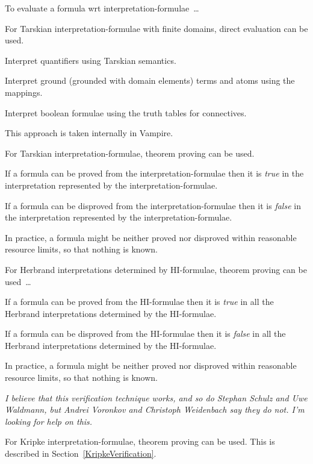 \documentclass{easychair}
\newenvironment{packed_itemize}{
\vspace*{-0.3em}
\begin{itemize}
\setlength{\partopsep}{0pt}
\setlength{\itemsep}{1pt}
\setlength{\parskip}{0pt}
\setlength{\parsep}{0pt}
}{\end{itemize}}
\begin{document}
To evaluate a formula wrt interpretation-formulae~\ldots
\begin{packed_itemize}
\item For Tarskian interpretation-formulae with finite domains, direct evaluation can be used.
      \begin{packed_itemize}
      \item Interpret quantifiers using Tarskian semantics.
      \item Interpret ground (grounded with domain elements) terms and atoms using the mappings.
      \item Interpret boolean formulae using the truth tables for connectives.
      \end{packed_itemize}
      This approach is taken internally in Vampire.
\item For Tarskian interpretation-formulae, theorem proving can be used.
      \begin{packed_itemize}
      \item If a formula can be proved from the interpretation-formulae then it is \textit{true} 
            in the interpretation represented by the interpretation-formulae.
      \item If a formula can be disproved from the interpretation-formulae then it is 
            \textit{false} in the interpretation represented by the interpretation-formulae.
      \item In practice, a formula might be neither proved nor disproved within reasonable 
            resource limits, so that nothing is known.
      \end{packed_itemize}
\item For Herbrand interpretations determined by HI-formulae, theorem proving can be used~\ldots
      \begin{packed_itemize}
      \item If a formula can be proved from the HI-formulae then it is \textit{true} in all 
            the Herbrand interpretations determined by the HI-formulae.
      \item If a formula can be disproved from the HI-formulae then it is \textit{false} in 
            all the Herbrand interpretations determined by the HI-formulae.
      \item In practice, a formula might be neither proved nor disproved within reasonable 
            resource limits, so that nothing is known.
      \end{packed_itemize}
      \emph{I believe that this verification technique works, and so do Stephan Schulz and 
      Uwe Waldmann, but Andrei Voronkov and Christoph Weidenbach say they do not.
      I'm looking for help on this.}
\item For Kripke interpretation-formulae, theorem proving can be used.
      This is described in Section~\ref{KripkeVerification}.
\end{packed_itemize}
\end{document}
